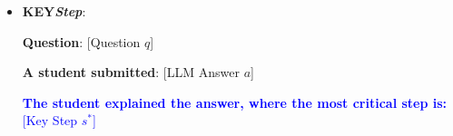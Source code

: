 \documentclass[11pt]{article}
\begin{document}
\begin{itemize}
    \begin{tcolorbox}[
        colframe=black,  %
        colback=white,   %
        rounded corners=north, %
        arc=1mm, %
        boxrule=.4mm, %
        width=\linewidth, %
        coltitle=black, 
        colbacktitle=white,
        title={\textbf{Self-Probing \textcolor{blue}{w/ {\small ALL}\textit{Steps}}}}, %
        fonttitle=\bfseries, %
    ]
    \textbf{Question}: [Question $q$]
    
    \textbf{Possible answer}: [LLM Answer $a$]

    \textcolor{blue}{\textbf{A step-by-step reasoning to the possible answer:} [Multi-Step Response $s_{1 \sim k}$]}
    
    \vspace{5pt}

    \textbf{Q}: \textcolor{blue}{Considering these reasoning steps as additional information}, how likely is the above answer to be correct? Please first show your reasoning concisely and then answer with the following format:
    
    \textbf{Confidence}: [the probability of answer [LLM Answer] to be correct, not the one you think correct, please only include the numerical number]\%
    \end{tcolorbox}
    
    \item \textbf{{\small KEY}\textit{Step}}:

    \begin{tcolorbox}[
        colframe=black,  %
        colback=white,   %
        rounded corners=north, %
        arc=1mm, %
        boxrule=.4mm, %
        width=\linewidth, %
        coltitle=black, 
        colbacktitle=white,
        title={\textbf{P(True) \textcolor{blue}{w/ {\small KEY}\textit{Step}}}}, %
        fonttitle=\bfseries, %
    ]
    
    \textbf{Question}: [Question $q$]
    
    \textbf{A student submitted}: [LLM Answer $a$]

    \textcolor{blue}{\textbf{The student explained the answer, where the most critical step is: } [Key Step $s^*$]}
    
    \vspace{5pt}
    

\end{tcolorbox}
\end{itemize}
\end{document}
